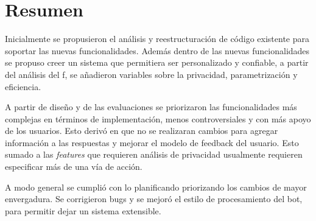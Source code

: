 \section{Resumen}

    \par Inicialmente se propusieron el análisis y reestructuración de código existente para soportar las nuevas funcionalidades. Además dentro de las nuevas funcionalidades se propuso creer un sistema que permitiera ser personalizado y confiable, a partir del análisis del \acrlong{f}, se añadieron variables sobre la privacidad, parametrización y eficiencia.
    
    \par A partir de diseño y de las evaluaciones se priorizaron las funcionalidades más complejas en términos de implementación, menos controversiales y con más apoyo de los usuarios. Esto derivó en que no se realizaran cambios para agregar información a las respuestas y mejorar el modelo de feedback del usuario. Esto sumado a las \textit{features} que requieren análisis de privacidad usualmente requieren especificar más de una vía de acción.
    
    \par A modo general se cumplió con lo planificando priorizando los cambios de mayor envergadura. Se corrigieron bugs y se mejoró el estilo de procesamiento del bot, para permitir dejar un sistema extensible.